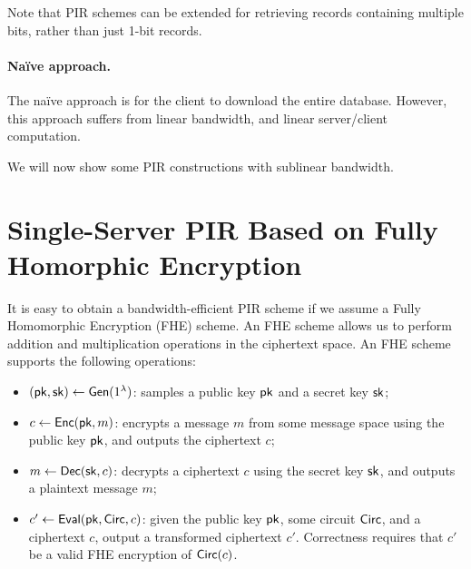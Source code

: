 Note that PIR schemes can be extended 
for retrieving records containing multiple bits, rather than
just 1-bit records. 


\paragraph{Na\"ive approach.} 
The na\"ive approach is for 
the client to download the entire database. 
However, this approach suffers from linear bandwidth,
and linear server/client computation. 

We will now show some PIR constructions with sublinear bandwidth.


\section{Single-Server PIR Based on Fully Homorphic
Encryption}


It is easy to obtain a bandwidth-efficient
PIR scheme if we assume a Fully Homomorphic Encryption (FHE)
scheme. 
An FHE scheme allows us to perform addition and multiplication operations 
in the ciphertext space. 
An FHE scheme supports
the following operations: %
\begin{itemize}
\item 
$({\sf pk}, {\sf sk}) \leftarrow {\sf Gen}(1^\lambda)$: samples
 a public key ${\sf pk}$ and a secret key ${\sf sk}$; 
\item 
$c \leftarrow {\sf Enc}({\sf pk}, m)$: encrypts a message $m$
from some message space using the public 
key ${\sf pk}$, and outputs the ciphertext $c$;
\item  
$m \leftarrow {\sf Dec}({\sf sk}, c)$: %
decrypts a ciphertext $c$ using the secret key ${\sf sk}$,
and outputs a plaintext message $m$;
\item  
$c' \leftarrow {\sf Eval}({\sf pk}, {\sf Circ}, c)$:
given 
the public key ${\sf pk}$, some circuit ${\sf Circ}$, and
a ciphertext $c$, output a transformed ciphertext $c'$.
Correctness requires that 
$c'$ be a valid FHE encryption of 
${\sf Circ}(c)$.
\end{itemize}

